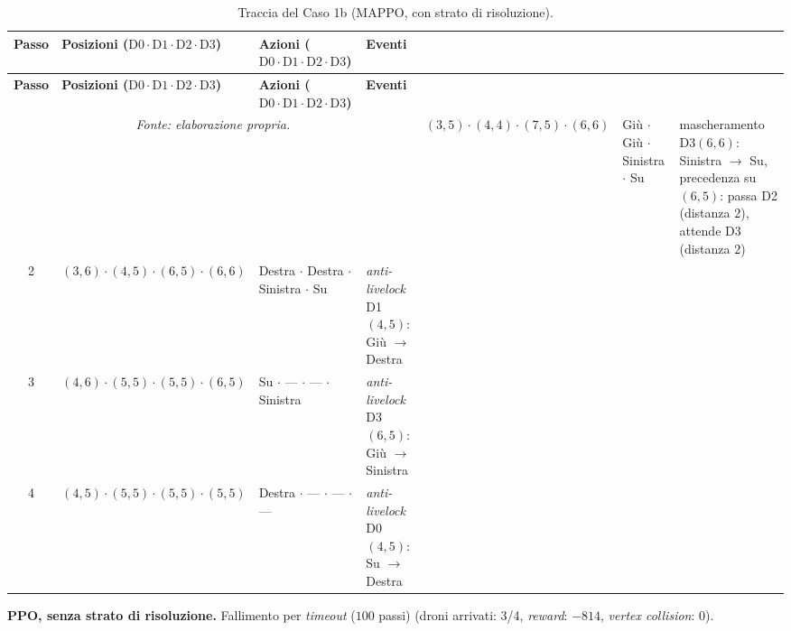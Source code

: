 \documentclass[12pt,a4paper,twoside]{report}
\begin{document}
{\footnotesize
\setlength{\tabcolsep}{3.5pt}
\begin{longtable}{c l l >{\raggedright\arraybackslash}p{3.8cm}}
\caption{Traccia del Caso 1b (MAPPO, con strato di risoluzione).}\\
\toprule
\textbf{Passo} & \textbf{Posizioni ($\text{D0} \cdot \text{D1} \cdot \text{D2} \cdot \text{D3}$)} & \textbf{Azioni ($\text{D0} \cdot \text{D1} \cdot \text{D2} \cdot \text{D3}$)} & \textbf{Eventi} \\
\midrule
\endfirsthead
\toprule
\textbf{Passo} & \textbf{Posizioni ($\text{D0} \cdot \text{D1} \cdot \text{D2} \cdot \text{D3}$)} & \textbf{Azioni ($\text{D0} \cdot \text{D1} \cdot \text{D2} \cdot \text{D3}$)} & \textbf{Eventi} \\
\midrule
\endhead
\bottomrule
\multicolumn{4}{c}{\footnotesize\emph{Fonte: elaborazione propria.}}
\endlastfoot
1 & $(3, 5) \cdot (4, 4) \cdot (7, 5) \cdot (6, 6)$ & Giù $\cdot$ Giù $\cdot$ Sinistra $\cdot$ Su       & mascheramento D3$(6, 6)$: Sinistra $\to$ Su, precedenza su $(6, 5)$: passa D2 (distanza $2$), attende D3 (distanza $2$) \\
2 & $(3, 6) \cdot (4, 5) \cdot (6, 5) \cdot (6, 6)$ & Destra $\cdot$ Destra $\cdot$ Sinistra $\cdot$ Su & \emph{anti-livelock} D1$(4, 5)$: Giù $\to$ Destra \\
3 & $(4, 6) \cdot (5, 5) \cdot (5, 5) \cdot (6, 5)$ & Su $\cdot$ --- $\cdot$ --- $\cdot$ Sinistra       & \emph{anti-livelock} D3$(6, 5)$: Giù $\to$ Sinistra \\*
4 & $(4, 5) \cdot (5, 5) \cdot (5, 5) \cdot (5, 5)$ & Destra $\cdot$ --- $\cdot$ --- $\cdot$ ---        & \emph{anti-livelock} D0$(4, 5)$: Su $\to$ Destra \\*
\end{longtable}
}

\noindent\textbf{PPO, senza strato di risoluzione.} Fallimento per \emph{timeout} ($100$ passi) (droni arrivati: 3/4, \emph{reward}: $-814$, \emph{vertex collision}: $0$).
\end{document}
